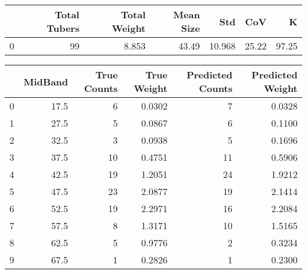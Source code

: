 \begin{tabular}{lrrrrrr}
\toprule
{} &  Total Tubers &  Total Weight &  Mean Size &     Std &    CoV &      K \\
\midrule
0 &            99 &         8.853 &      43.49 &  10.968 &  25.22 &  97.25 \\
\bottomrule
\end{tabular}

\begin{tabular}{lrrrrr}
\toprule
{} &  MidBand &  True Counts &  True Weight &  Predicted Counts &  Predicted Weight \\
\midrule
0 &     17.5 &            6 &       0.0302 &                 7 &            0.0328 \\
1 &     27.5 &            5 &       0.0867 &                 6 &            0.1100 \\
2 &     32.5 &            3 &       0.0938 &                 5 &            0.1696 \\
3 &     37.5 &           10 &       0.4751 &                11 &            0.5906 \\
4 &     42.5 &           19 &       1.2051 &                24 &            1.9212 \\
5 &     47.5 &           23 &       2.0877 &                19 &            2.1414 \\
6 &     52.5 &           19 &       2.2971 &                16 &            2.2084 \\
7 &     57.5 &            8 &       1.3171 &                10 &            1.5165 \\
8 &     62.5 &            5 &       0.9776 &                 2 &            0.3234 \\
9 &     67.5 &            1 &       0.2826 &                 1 &            0.2300 \\
\bottomrule
\end{tabular}

